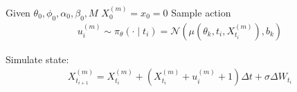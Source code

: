 \documentclass[a4paper, 12pt]{scrartcl}
\newcommand{\norm}[1]{\left\lVert#1\right\lVert}
\begin{document}
\begin{algorithm}
    \caption{Actor-Critic Algorithm for a stochastic Control Problem}
    \begin{algorithmic}[H]
        \State Given $\theta_0 , \phi_0 , \alpha_0 , \beta_0 , M$
        \While{$\norm{\theta_{k+1} - \theta_{k}} > \epsilon$}
                $X_0^{(m)} = x_0 = 0$
                    \State Sample action 
                    \begin{align*}
                        u_{i}^{(m)} \sim \pi_{\theta}( \cdot \mid t_i) 
                        = \mathcal{N}(\mu(\theta_k,t_i, X_{t_i}^{(m)}), b_k)
                    \end{align*}

                    \State Simulate state:
                    \begin{align*}
                        X_{t_{i+1}}^{(m)} 
                        = X_{t_i}^{(m)} + (X_{t_i}^{(m)} + u_{i}^{(m)} + 1) \Delta t 
                        + \sigma \Delta W_{t_i}
                    \end{align*}


\end{algorithmic}
\end{algorithm}
\end{document}
